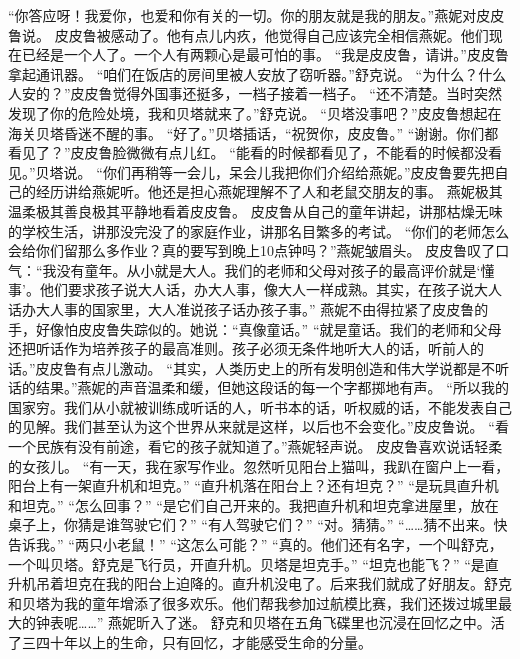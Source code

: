 \documentclass[a4paper,12pt,UTF8,twoside]{ctexbook}
\begin{document}
        “你答应呀！我爱你，也爱和你有关的一切。你的朋友就是我的朋友。”燕妮对皮皮鲁说。 
        皮皮鲁被感动了。他有点儿内疚，他觉得自己应该完全相信燕妮。他们现在已经是一个人了。一个人有两颗心是最可怕的事。 
        “我是皮皮鲁，请讲。”皮皮鲁拿起通讯器。 
        “咱们在饭店的房间里被人安放了窃听器。”舒克说。 
        “为什么？什么人安的？”皮皮鲁觉得外国事还挺多，一档子接着一档子。 
        “还不清楚。当时突然发现了你的危险处境，我和贝塔就来了。”舒克说。 
        “贝塔没事吧？”皮皮鲁想起在海关贝塔昏迷不醒的事。 
        “好了。”贝塔插话，“祝贺你，皮皮鲁。” 
        “谢谢。你们都看见了？”皮皮鲁脸微微有点儿红。 
        “能看的时候都看见了，不能看的时候都没看见。”贝塔说。 
        “你们再稍等一会儿，呆会儿我把你们介绍给燕妮。”皮皮鲁要先把自己的经历讲给燕妮听。他还是担心燕妮理解不了人和老鼠交朋友的事。 
        燕妮极其温柔极其善良极其平静地看着皮皮鲁。 
        皮皮鲁从自己的童年讲起，讲那枯燥无味的学校生活，讲那没完没了的家庭作业，讲那名目繁多的考试。 
        “你们的老师怎么会给你们留那么多作业？真的要写到晚上10点钟吗？”燕妮皱眉头。 
        皮皮鲁叹了口气：“我没有童年。从小就是大人。我们的老师和父母对孩子的最高评价就是‘懂事’。他们要求孩子说大人话，办大人事，像大人一样成熟。其实，在孩子说大人话办大人事的国家里，大人准说孩子话办孩子事。” 
        燕妮不由得拉紧了皮皮鲁的手，好像怕皮皮鲁失踪似的。她说：“真像童话。” 
        “就是童话。我们的老师和父母还把听话作为培养孩子的最高准则。孩子必须无条件地听大人的话，听前人的话。”皮皮鲁有点儿激动。 
        “其实，人类历史上的所有发明创造和伟大学说都是不听话的结果。”燕妮的声音温柔和缓，但她这段话的每一个字都掷地有声。 
        “所以我的国家穷。我们从小就被训练成听话的人，听书本的话，听权威的话，不能发表自己的见解。我们甚至认为这个世界从来就是这样，以后也不会变化。”皮皮鲁说。 
        “看一个民族有没有前途，看它的孩子就知道了。”燕妮轻声说。 
        皮皮鲁喜欢说话轻柔的女孩儿。 
        “有一天，我在家写作业。忽然听见阳台上猫叫，我趴在窗户上一看，阳台上有一架直升机和坦克。” 
        “直升机落在阳台上？还有坦克？” 
        “是玩具直升机和坦克。” 
        “怎么回事？” 
        “是它们自己开来的。我把直升机和坦克拿进屋里，放在桌子上，你猜是谁驾驶它们？” 
        “有人驾驶它们？” 
        “对。猜猜。” 
        “……猜不出来。快告诉我。” 
        “两只小老鼠！” 
        “这怎么可能？” 
        “真的。他们还有名字，一个叫舒克，一个叫贝塔。舒克是飞行员，开直升机。贝塔是坦克手。” 
        “坦克也能飞？” 
        “是直升机吊着坦克在我的阳台上迫降的。直升机没电了。后来我们就成了好朋友。舒克和贝塔为我的童年增添了很多欢乐。他们帮我参加过航模比赛，我们还拨过城里最大的钟表呢……” 
        燕妮昕入了迷。 
        舒克和贝塔在五角飞碟里也沉浸在回忆之中。活了三四十年以上的生命，只有回忆，才能感受生命的分量。 
\end{document}
